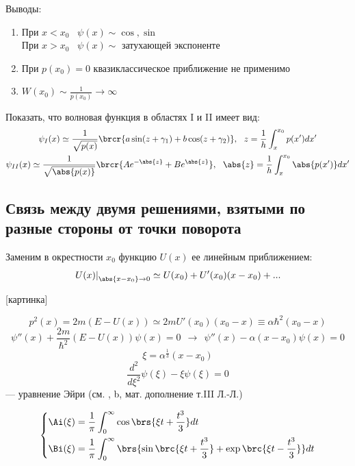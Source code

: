 Выводы:
\renewcommand{\labelenumi}{\arabic{enumi})}
\begin{enumerate}
\item При $x<x_0$~ $\psi(x) \sim \cos, \sin$\\
При $x>x_0$~ $\psi(x) \sim$ затухающей экспоненте
\item При $p(x_0) = 0$ квазиклассическое приближение не применимо
\item $W(x_0) \sim \frac{1}{p(x_0)} \to \infty$
\end{enumerate}

\begin{excr}
Показать, что волновая функция в областях I и II имеет вид:
$$
\begin{gathered}
\psi_I(x) \simeq \frac{1}{\sqrt{p(x)}} \brcr{a \sin(z+\gamma_1) + b \cos(z+\gamma_2)},~~ z = \frac{1}{h}\int_x^{x_0} p(x')dx'\\
\psi_{II}(x) \simeq \frac{1}{\sqrt{\abs{p(x)}}} \brcr{A e^{-\abs{z}} + B e^{\abs{z}}},~~ \abs{z} = \frac{1}{h}\int_x^{x_0} \abs{p(x')}dx'
\end{gathered}
$$
\end{excr}

\subsection{Связь между двумя решениями, взятыми по разные стороны от точки поворота}
Заменим в окрестности $x_0$ функцию $U(x)$ ее линейным приближением:
$$
\left. U(x) \right|_{\abs{x-x_0} \to 0} \simeq U(x_0) + U'(x_0)(x-x_0)+...
$$

[картинка]

$$
p^2(x) = 2m(E-U(x)) \simeq 2m U'(x_0)(x_0 - x) \equiv \alpha \hbar^2 (x_0 - x)
$$
$$
\psi''(x) + \frac{2m}{\hbar^2} (E-U(x)) \psi(x) = 0 ~~\rightarrow~~ \psi''(x) - \alpha(x-x_0) \psi(x) = 0
$$
$$
\xi = \alpha^{\frac{1}{3}} (x-x_0)
$$
$$
\boxed{
	\frac{d^2}{d\xi^2}\psi(\xi) - \xi\psi(\xi) = 0
}
$$
--- уравнение Эйри (см. , \textsection b, мат. дополнение т.III Л.-Л.)

$$
\left\{
\begin{aligned}
\Ai(\xi) &= \frac{1}{\pi} \int_0^\infty \cos\brs{\xi t + \frac{t^3}{3}} dt \\
\Bi(\xi) &= \frac{1}{\pi} \int_0^\infty \brs{ \sin\brc{\xi t + \frac{t^3}{3}} + \exp\brc{\xi t - \frac{t^3}{3}} } dt
\end{aligned}
\right.
$$

